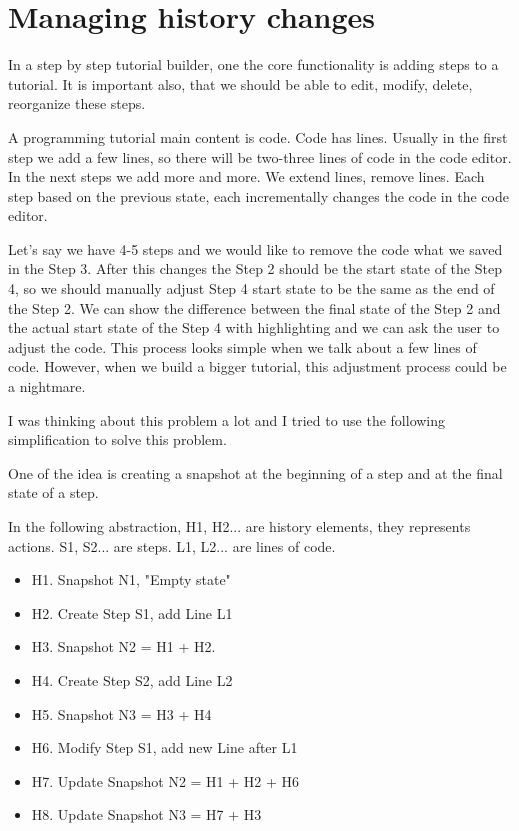 \documentclass[12pt, a4paper, oneside, openright, medskipamount]{report}
\begin{document}
\section{Managing history changes} \label{history}

In a step by step tutorial builder, one the core functionality is adding steps to a tutorial. It is important also, that we should be able to edit, modify, delete, reorganize these steps.

A programming tutorial main content is code. Code has lines. Usually in the first step we add a few lines, so there will be two-three lines of code in the code editor. In the next steps we add more and more. We extend lines, remove lines. Each step based on the previous state, each incrementally changes the code in the code editor.

Let's say we have 4-5 steps and we would like to remove the code what we saved in the Step 3. After this changes the Step 2 should be the start state of the Step 4, so we should manually adjust Step 4 start state to be the same as the end of the Step 2. We can show the difference between the final state of the Step 2 and the actual start state of the Step 4 with highlighting and we can ask the user to adjust the code. This process looks simple when we talk about a few lines of code. However, when we build a bigger tutorial, this adjustment process could be a nightmare.

I was thinking about this problem a lot and I tried to use the following simplification to solve this problem.

One of the idea is creating a snapshot at the beginning of a step and at the final state of a step.

In the following abstraction, H1, H2... are history elements, they represents actions. S1, S2... are steps. L1, L2... are lines of code.

\begin{itemize}[noitemsep]
\item H1. Snapshot N1, "Empty state"
\item H2. Create Step S1, add Line L1
\item H3. Snapshot N2 = H1 + H2.
\item H4. Create Step S2, add Line L2
\item H5. Snapshot N3 = H3 + H4
\item H6. Modify Step S1, add new Line after L1
\item H7. Update Snapshot N2 = H1 + H2 + H6
\item H8. Update Snapshot N3 = H7 + H3
\end{itemize}
\end{document}

